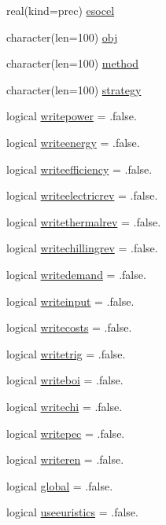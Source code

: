 \begin{DoxyCompactItemize}
real(kind=prec) \hyperlink{classinputvar_a761214782c22ee31b6da74c0984cb9e2}{esocel}
\item 
character(len=100) \hyperlink{classinputvar_ab5d2f467a214e31204c18a24582b81bb}{obj}
\item 
character(len=100) \hyperlink{classinputvar_ad9c1a09ed4bd46ad673997ee302451a4}{method}
\item 
character(len=100) \hyperlink{classinputvar_a6e328846c755855ac2ac87d5a63d402a}{strategy}
\item 
logical \hyperlink{classinputvar_ae3e0dfd2907bb36d0f62715b24f63536}{writepower} = .false.
\item 
logical \hyperlink{classinputvar_ae3e52c17a47fe8dd3e860abff881cfb0}{writeenergy} = .false.
\item 
logical \hyperlink{classinputvar_a7d67f2fa2027e1d60264f442eef9759c}{writeefficiency} = .false.
\item 
logical \hyperlink{classinputvar_afd3b4bc26c396eaba06cecc08717acf1}{writeelectricrev} = .false.
\item 
logical \hyperlink{classinputvar_ae7817d3a1abb7e02fdd1d3f40b45a4e8}{writethermalrev} = .false.
\item 
logical \hyperlink{classinputvar_a2d475a99a1a0efcca534104cf8e2efb5}{writechillingrev} = .false.
\item 
logical \hyperlink{classinputvar_ad6cafaf46b6d0f5bfaeb1ca26ccd0c68}{writedemand} = .false.
\item 
logical \hyperlink{classinputvar_a97c8b194b0db24c1c790d57bcc7b0f70}{writeinput} = .false.
\item 
logical \hyperlink{classinputvar_a5fa854d48ca73d10b807273f373076b2}{writecosts} = .false.
\item 
logical \hyperlink{classinputvar_a676701049b4d18d378d94894b1fcae7b}{writetrig} = .false.
\item 
logical \hyperlink{classinputvar_adfc2c014d1631c831bd700d9ff13dcff}{writeboi} = .false.
\item 
logical \hyperlink{classinputvar_a6e34f329672526cc9e682125013ce5e7}{writechi} = .false.
\item 
logical \hyperlink{classinputvar_a81f46f9ef3ef3bdb78c79994791f3472}{writepec} = .false.
\item 
logical \hyperlink{classinputvar_aaea9119ed7c4fbad274831007b696f46}{writeren} = .false.
\item 
logical \hyperlink{classinputvar_aa558f36057a5ae647fb16b9659b90d04}{global} = .false.
\item 
logical \hyperlink{classinputvar_a04f11d38b133803024202cc546abddc3}{useeuristics} = .false.

\end{DoxyCompactItemize}
